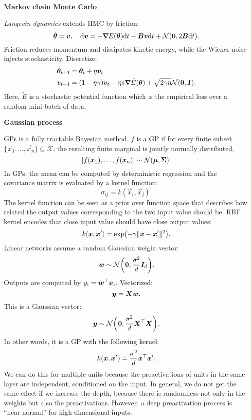 \documentclass[10pt]{article}
\newenvironment{topic}[1]
{\textbf{\sffamily \colorbox{black}{\rlap{\textbf{\textcolor{white}{#1}}}\hspace{\linewidth}\hspace{-2\fboxsep}}}}
{}
\newenvironment{subtopic}[1]
{\begin{center}\textbf{\sffamily #1}\end{center}}
{}
\begin{document}
\begin{multicols*}{3}
\begin{topic}{Bayesian learning}
\begin{subtopic}{Markov chain Monte Carlo}
            \textit{Langevin dynamics} extends HMC by friction: \[
                \dot{\bm{\theta}} = \bm{v}, \quad \mathrm{d}\bm{v} = -\bm{\nabla}_{\! } E(\bm{\theta}) \mathrm{d}t - \bm{B} \bm{v}\mathrm{d}t + \mathcal{N}(\bm{0}, 2 \bm{B} \mathrm{d}t).
            \]
            Friction reduces momentum and dissipates kinetic energy, while the Wiener noise injects
            stochasticity. Discretize:
            \begin{align*}
                \bm{\theta}_{t+1} & = \bm{\theta}_t + \eta \bm{v}_t \\
                \bm{v}_{t+1} & = (1-\eta \gamma) \bm{v}_t - \eta s \bm{\nabla}_{\! } \tilde{E}(\bm{\theta}) + \sqrt{2 \gamma \eta} \mathcal{N}(\bm{0}, \bm{I}).
            \end{align*}
            Here, $\tilde{E}$ is a stochastic potential function which is the empirical loss over a random
            mini-batch of data.
        \end{subtopic}

        \begin{subtopic}{Gaussian process}
            GPs is a fully tractable Bayesian method. $f$ is a GP if for every finite subset $\{ \vec{x}_1, \ldots, \vec{x}_n \} \subseteq \mathcal{X}$, the resulting finite marginal is jointly normally distributed, \[
                [f(\bm{x}_1), \ldots, f(\bm{x}_n)] \sim \mathcal{N}(\bm{\mu}, \bm{\Sigma}).
            \]
            In GPs, the mean can be computed by deterministic regression and the covariance matrix is evaluated
            by a kernel function: \[
                \sigma_{ij} = k(\vec{x}_i, \vec{x}_j).
            \]
            The kernel function can be seen as a prior over function space that describes how related the
            output values corresponding to the two input value should be. RBF kernel encodes that close input
            value should have close output values: \[
                k(\vec{x}, \vec{x}') = \exp \lft( -\gamma \| \vec{x} - \vec{x}' \|^2 \rgt).
            \]
            Linear networks assume a random Gaussian weight vector: \[
                \vec{w} \sim \mathcal{N}\lft(\vec{0}, \frac{\sigma^2}{d} \mat{I}_d\rgt).
            \]
            Outputs are computed by $y_i = \bm{w}^\top\bm{x}_i$. Vectorized: \[
                \bm{y} = \bm{X} \bm{w}.
            \]
            This is a Gaussian vector: \[
                \vec{y} \sim \mathcal{N}\lft(\vec{0}, \frac{\sigma^2}{d} \transpose{\mat{X}} \mat{X} \rgt).
            \]
            In other words, it is a GP with the following kernel: \[
                k(\bm{x}, \bm{x}') = \frac{\sigma^2}{d} \bm{x}^\top\bm{x}'.
            \]
            We can do this for multiple units because the preactivations of units in the same layer are
            independent, conditioned on the input. In general, we do not get the same effect if we increase the
            depth, because there is randomness not only in the weights but also the preactivations. However, a
            deep preactivation process is ``near normal'' for high-dimensional inputs.


\end{subtopic}
\end{topic}
\end{multicols*}
\end{document}
